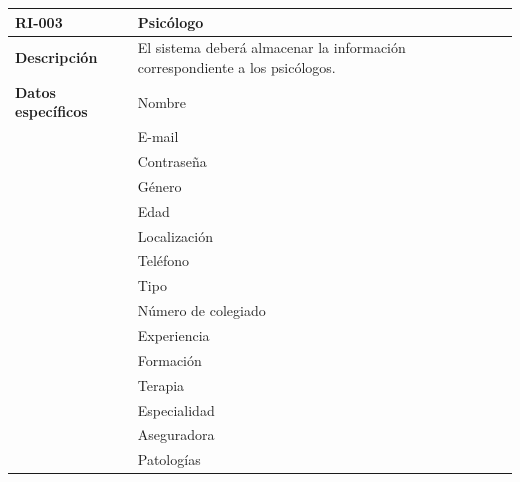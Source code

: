 \begin{table}[htpb]
\centering
\begin{tabularx}{\textwidth}{|l|X|}
\hline
\textbf{RI-003}             & \textbf{Psicólogo}                                                                    \\ \hline
\textbf{Descripción}        & El sistema deberá almacenar la información correspondiente a los psicólogos. \\ \hline
\textbf{Datos específicos}  & Nombre                                                                       \\ \hline
\multirow{18}{*}{} & E-mail                                                                       \\ 
                   & Contraseña                                                                   \\  
                   & Género                                                                       \\ 
                   & Edad                                                                         \\  
                   & Localización                                                                 \\ 
                   & Teléfono                                                                     \\ 
                   & Tipo                                                                         \\ 
                   & Número de colegiado                                                                        \\  
                   & Experiencia                                                                  \\ 
                   & Formación                                                                    \\ 
                   & Terapia                                                                      \\ 
                   & Especialidad                                                                 \\ 
                   & Aseguradora                                                                  \\  
                   & Patologías                                                                   \\  

\end{tabularx}
\end{table}
